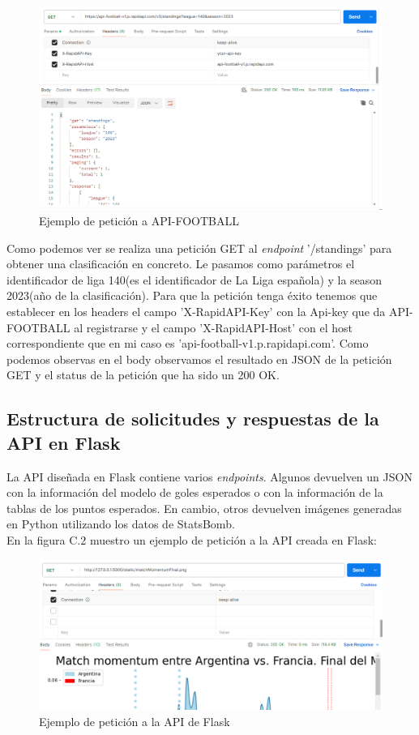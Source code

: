 \begin{figure}[H]
    \centering
    \includegraphics[width=1\linewidth]{img/ejemploPostman.png}
    \caption{Ejemplo de petición a API-FOOTBALL}
    \label{fig:enter-label}
\end{figure}

Como podemos ver se realiza una petición GET al \textit{endpoint} '/standings' para obtener una clasificación en concreto. Le pasamos como parámetros el identificador de liga 140(es el identificador de La Liga española) y la season 2023(año de la clasificación). Para que la petición tenga éxito tenemos que establecer en los headers el campo 'X-RapidAPI-Key' con la Api-key que da API-FOOTBALL al registrarse y el campo 'X-RapidAPI-Host' con el host correspondiente que en mi caso es 'api-football-v1.p.rapidapi.com'. Como podemos observas en el body observamos el resultado en JSON de la petición GET y el status de la petición que ha sido un 200 OK.
\subsection{Estructura de solicitudes y respuestas de la API en Flask}
La API diseñada en Flask contiene varios \textit{endpoints}. Algunos devuelven un JSON con la información del modelo de goles esperados o con la información de la tablas de los puntos esperados. En cambio, otros devuelven imágenes generadas en Python utilizando los datos de StatsBomb.\\
En la figura C.2 muestro un ejemplo de petición a la API creada en Flask:

\begin{figure}[H]
    \centering
    \includegraphics[width=1\linewidth]{img/ejemploPostman2.png}
    \caption{Ejemplo de petición a la API de Flask}
    \label{fig:enter-label}
\end{figure}

